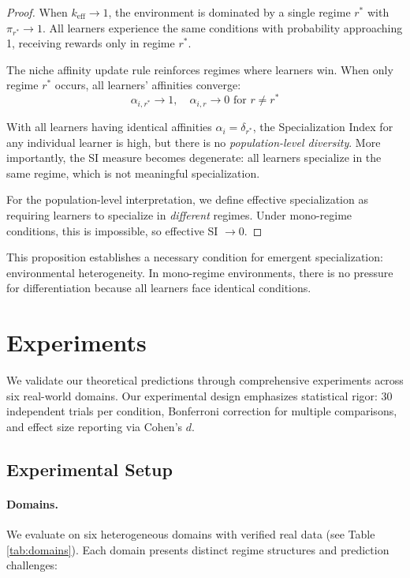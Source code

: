 \documentclass{article}
\begin{document}
\begin{proof}
When $k_{\text{eff}} \to 1$, the environment is dominated by a single regime $r^*$ with $\pi_{r^*} \to 1$. All learners experience the same conditions with probability approaching 1, receiving rewards only in regime $r^*$.

The niche affinity update rule reinforces regimes where learners win. When only regime $r^*$ occurs, all learners' affinities converge:
\begin{equation}
    \alpha_{i,r^*} \to 1, \quad \alpha_{i,r} \to 0 \text{ for } r \neq r^*
\end{equation}

With all learners having identical affinities $\alpha_i = \delta_{r^*}$, the Specialization Index for any individual learner is high, but there is no \emph{population-level diversity}. More importantly, the SI measure becomes degenerate: all learners specialize in the same regime, which is not meaningful specialization.

For the population-level interpretation, we define effective specialization as requiring learners to specialize in \emph{different} regimes. Under mono-regime conditions, this is impossible, so effective SI $\to 0$.
\end{proof}

This proposition establishes a necessary condition for emergent specialization: environmental heterogeneity. In mono-regime environments, there is no pressure for differentiation because all learners face identical conditions.

\section{Experiments}
\label{sec:experiments}

We validate our theoretical predictions through comprehensive experiments across six real-world domains. Our experimental design emphasizes statistical rigor: 30 independent trials per condition, Bonferroni correction for multiple comparisons, and effect size reporting via Cohen's $d$.

\subsection{Experimental Setup}

\paragraph{Domains.} We evaluate on six heterogeneous domains with verified real data (see Table \ref{tab:domains}). Each domain presents distinct regime structures and prediction challenges:
\end{document}
